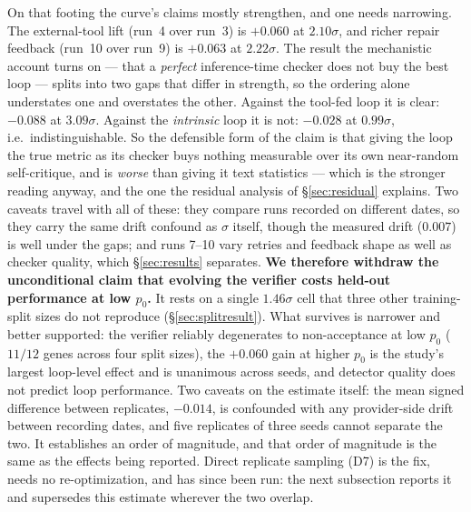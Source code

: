 \documentclass[11pt]{article}
\begin{document}
On that footing the curve's claims mostly strengthen, and one needs narrowing. The external-tool
lift (run~4 over run~3) is $+0.060$ at $2.10\sigma$, and richer repair feedback (run~10 over
run~9) is $+0.063$ at $2.22\sigma$. The result the mechanistic account turns on --- that a
\emph{perfect} inference-time checker does not buy the best loop --- splits into two gaps that
differ in strength, so the ordering alone understates one and overstates the other. Against the
tool-fed loop it is clear:
$-0.088$ at $3.09\sigma$. Against the \emph{intrinsic} loop it is not: $-0.028$ at $0.99\sigma$,
i.e.\ indistinguishable. So the defensible form of the claim is that giving the loop the true
metric as its checker buys nothing measurable over its own near-random self-critique, and is
\emph{worse} than giving it text statistics --- which is the stronger reading anyway, and the one
the residual analysis of \S\ref{sec:residual} explains. Two caveats travel with all of these:
they compare runs recorded on different dates, so they carry the same drift confound as $\sigma$
itself, though the measured drift ($0.007$) is well under the gaps; and runs 7--10 vary retries
and feedback shape as well as checker quality, which \S\ref{sec:results} separates. \textbf{We therefore withdraw the unconditional claim that evolving
the verifier costs held-out performance at low $p_0$.} It rests on a single $1.46\sigma$ cell
that three other training-split sizes do not reproduce (\S\ref{sec:splitresult}). What survives
is narrower and better supported: the verifier reliably degenerates to non-acceptance at low
$p_0$ ($11/12$ genes across four split sizes), the $+0.060$ gain at higher $p_0$ is the
study's largest loop-level effect and is unanimous across seeds, and detector quality does not
predict loop performance. Two caveats on the estimate itself: the mean signed difference
between replicates, $-0.014$, is confounded with any provider-side drift between recording
dates, and five replicates of three seeds cannot separate the two. It establishes an order of
magnitude, and that order of magnitude is the same as the effects being reported. Direct
replicate sampling (D7) is the fix, needs no re-optimization, and has since been run: the next
subsection reports it and supersedes this estimate wherever the two overlap.
\end{document}
